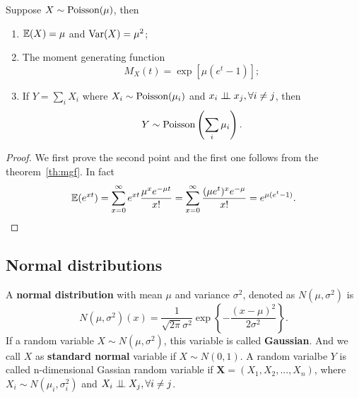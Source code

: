 \begin{theorem}
Suppose $X\sim\text{Poisson}(\mu)$, then
\begin{enumerate}
\item $\mathbb{E}(X)=\mu$ and $\text{Var}(X)=\mu^2$;
\item The moment generating function
\begin{equation}
M_X(t)=\exp[\mu(e^t-1)];
\end{equation}
\item If $Y=\sum_iX_i$ where $X_i\sim\text{Poisson}(\mu_i)$ and $x_i\perp\!\!\!\perp x_j,\forall i\ne j$, then
\begin{equation}
Y\sim\text{Poisson}\left(\sum_i\mu_i\right).
\end{equation}
\end{enumerate}
\end{theorem}

\begin{proof}
We first prove the second point and the first one follows from the theorem~\ref{th:mgf}. In fact
\begin{equation*}
\mathbb{E}(e^{x t})=\sum_{x=0}^\infty e^{x t}\frac{\mu^x e^{-\mu t}}{x!}=\sum_{x=0}^\infty\frac{(\mu e^t)^xe^{-\mu}}{x!}=e^{\mu(e^t-1)}.
\end{equation*} 
\end{proof}



\subsection{Normal distributions}
\begin{definition}
A \textbf{normal distribution} with mean $\mu$ and variance $\sigma^2$, denoted as $N(\mu,\sigma^2)$ is 
\begin{equation}
N(\mu,\sigma^2)(x) = \frac{1}{\sqrt{2\pi}\sigma^2}\exp\left\{-\frac{(x-\mu)^2}{2\sigma^2}\right\}.
\end{equation}
If a random variable $X\sim N(\mu,\sigma^2)$, this variable is called \textbf{Gaussian}. And we call $X$ as \textbf{standard normal} variable if $X\sim N(0,1)$.
A random varialbe $Y$ is called n-dimensional Gassian random variable if $\boldsymbol{X}=(X_1,X_2,...,X_n)$, where $X_i\sim N(\mu_i,\sigma_i^2)$ and $X_i\perp\!\!\!\perp X_j,\forall i\ne j$.
\end{definition}

